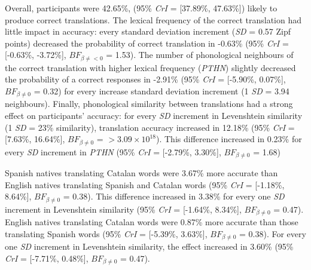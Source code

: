 \documentclass[
  english,
  man,floatsintext]{apa6}
\begin{document}
Overall, participants were 42.65\%, (95\% \emph{CrI} = {[}37.89\%, 47.63\%{]}) likely to produce correct translations. The lexical frequency of the correct translation had little impact in accuracy: every standard deviation increment (\emph{SD} = 0.57 Zipf points) decreased the probability of correct translation in -0.63\% (95\% \emph{CrI} = {[}-0.63\%, -3.72\%{]}, \(BF_{\beta\neq< 0}\) = 1.53). The number of phonological neighbours of the correct translation with higher lexical frequency (\emph{PTHN}) slightly decreased the probability of a correct responses in -2.91\% (95\% \emph{CrI} = {[}-5.90\%, 0.07\%{]}, \(BF_{\beta \neq 0}\) = 0.32) for every increase standard deviation increment (1 \emph{SD} = 3.94 neighbours). Finally, phonological similarity between translations had a strong effect on participants' accuracy: for every \emph{SD} increment in Levenshtein similarity (1 \emph{SD} = 23\% similarity), translation accuracy increased in 12.18\% (95\% \emph{CrI} = {[}7.63\%, 16.64\%{]}, \(BF_{\beta \neq 0}\) = \(>3.09 \times 10^{18}\)). This difference increased in 0.23\% for every \emph{SD} increment in \emph{PTHN} (95\% \emph{CrI} = {[}-2.79\%, 3.30\%{]}, \(BF_{\beta \neq 0}\) = 1.68)

Spanish natives translating Catalan words were 3.67\% more accurate than English natives translating Spanish and Catalan words (95\% \emph{CrI} = {[}-1.18\%, 8.64\%{]}, \(BF_{\beta \neq 0}\) = 0.38). This difference increased in 3.38\% for every one \emph{SD} increment in Levenshtein similarity (95\% \emph{CrI} = {[}-1.64\%, 8.34\%{]}, \(BF_{\beta \neq 0}\) = 0.47). English natives translating Catalan words were 0.87\% more accurate than those translating Spanish words (95\% \emph{CrI} = {[}-5.39\%, 3.63\%{]}, \(BF_{\beta \neq 0}\) = 0.38). For every one \emph{SD} increment in Levenshtein similarity, the effect increased in 3.60\% (95\% \emph{CrI} = {[}-7.71\%, 0.48\%{]}, \(BF_{\beta \neq 0}\) = 0.47).
\end{document}

